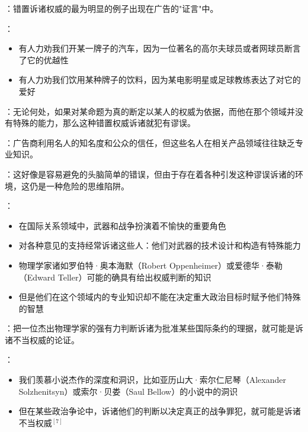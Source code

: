 \begin{examplebox}[title=广告中的不当权威诉诸]
：错置诉诸权威的最为明显的例子出现在广告的"证言"中。

：
\begin{itemize}
  \item 有人力劝我们开某一牌子的汽车，因为一位著名的高尔夫球员或者网球员断言了它的优越性
  \item 有人力劝我们饮用某种牌子的饮料，因为某电影明星或足球教练表达了对它的爱好
\end{itemize}

：无论何处，如果对某命题为真的断定以某人的权威为依据，而他在那个领域并没有特殊的能力，那么这种错置权威诉诸就犯有谬误。

：广告商利用名人的知名度和公众的信任，但这些名人在相关产品领域往往缺乏专业知识。
\end{examplebox}

\begin{examplebox}[title=政治和国际关系中的权威问题]
：这好像是容易避免的头脑简单的错误，但由于存在着各种引发这种谬误诉诸的环境，这仍是一种危险的思维陷阱。

：
\begin{itemize}
  \item 在国际关系领域中，武器和战争扮演着不愉快的重要角色
  \item 对各种意见的支持经常诉诸这些人：他们对武器的技术设计和构造有特殊能力
  \item 物理学家诸如罗伯特·奥本海默（Robert Oppenheimer）或爱德华·泰勒（Edward Teller）可能的确具有给出权威判断的知识
  \item 但是他们在这个领域内的专业知识却不能在决定重大政治目标时赋予他们特殊的智慧
\end{itemize}

：把一位杰出物理学家的强有力判断诉诸为批准某些国际条约的理据，就可能是诉诸不当权威的论证。

：
\begin{itemize}
  \item 我们羡慕小说杰作的深度和洞识，比如亚历山大·索尔仁尼琴（Alexander Solzhenitsyn）或索尔·贝娄（Saul Bellow）的小说中的洞识
  \item 但在某些政治争论中，诉诸他们的判断以决定真正的战争罪犯，就可能是诉诸不当权威$^{[7]}$
\end{itemize}
\end{examplebox}

